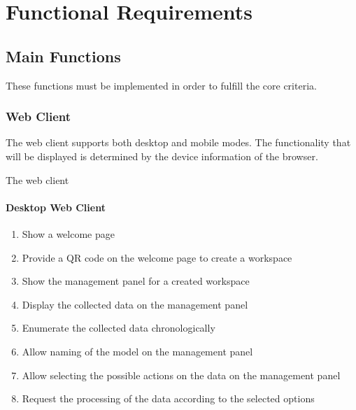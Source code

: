 \section{Functional Requirements}

\subsection{Main Functions}
These functions must be implemented in order to fulfill the core criteria.

\subsubsection{Web Client}
The web client supports both desktop and mobile modes. The functionality that will be displayed is determined by the device information of the browser.

The web client 

\paragraph{Desktop Web Client}

\def\twodigits#1{%
  \ifnum#1<10 0\fi
  \number#1}

\begin{enumerate}[{label = \textbf{/F{\protect\twodigits{\arabic{enumi}}}0/}, leftmargin = *}]
    \item Show a welcome page
    \item Provide a QR code on the welcome page to create a \gls{workspace}
    \item Show the management panel for a created workspace
    \item Display the collected data on the management panel
    \item Enumerate the collected data chronologically
    \item Allow naming of the model on the management panel
    \item Allow selecting the possible actions on the data on the management panel %
    \item Request the processing of the data according to the selected options
\end{enumerate}

